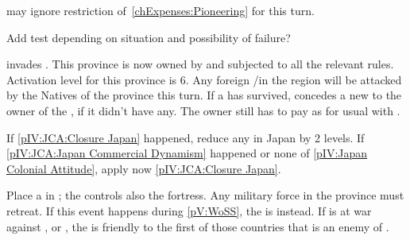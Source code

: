 \phadm
\aparag \RUS may ignore restriction of~\ref{chExpenses:Pioneering} for this
turn.





\begin{todo}
  Add test depending on situation and possibility of failure?
\end{todo}

\phevnt
\aparag \paysChina invades \granderegionFormose.  This province is now owned
by \paysChina and subjected to all the relevant rules. Activation level for
this province is 6.
\aparag Any foreign \TP/\COL in the region will be attacked by the Natives of
the province this turn.
\aparag If a \TP has survived,  concedes a new \dipAT to the owner
of the \TP, if it didn't have any. The owner still has to pay as for usual
\dipAT with \paysChine.





\phevnt{}
\aparag If \ref{pIV:JCA:Closure Japan} happened, reduce any \TP in Japan by 2
levels.
\aparag If \ref{pIV:JCA:Japan Commercial Dynamism} happened or none of
\ref{pIV:Japan Colonial Attitude}, apply now \ref{pIV:JCA:Closure Japan}.










\phevnt
\aparag Place a \REVOLT \facemoins in \provinceCatalunya ; the \REVOLT
controls also the fortress. Any military force in the province must retreat.
\bparag If this event happens during \ref{pV:WoSS}, the \REVOLT is \faceplus
instead.
\aparag If \SPA is at war against \FRA, \ENG or \AUT, the \REVOLT is friendly
to the first of those countries that is an enemy of \SPA.

